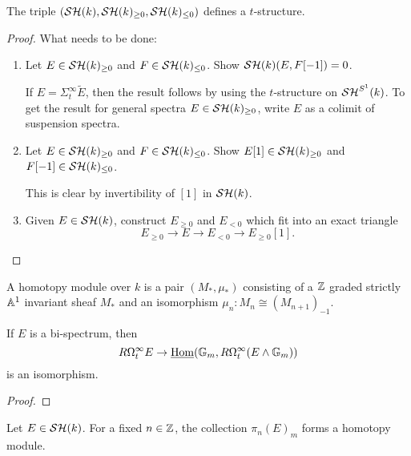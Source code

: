 \documentclass{amsart}%
\begin{document}
\begin{theorem}
  The triple $(\mathcal{SH}(k), \mathcal{SH}(k)_{\geq 0}, \mathcal{SH}(k)_{\leq 0})$ defines a
  $t$-structure.
\end{theorem}

\begin{proof}
What needs to be done: 
\begin{enumerate}
    \item Let $E \in \mathcal{SH}(k)_{\geq 0}$ and $F \in \mathcal{SH}(k)_{\leq
    0}$. Show $\mathcal{SH}(k)(E,F[-1])=0$. 

  If $E = \Sigma^{\infty}_t \tilde{E}$, then the result follows by
  using the $t$-structure on $\mathcal{SH}^{S^1}(k)$. To get the result for
  general spectra $E \in \mathcal{SH}(k)_{\geq 0}$, write $E$ as a colimit of 
  suspension spectra.

    \item Let $E \in \mathcal{SH}(k)_{\geq 0}$ and $F \in \mathcal{SH}(k)_{\leq 0}$.
  Show $E[1] \in \mathcal{SH}(k)_{\geq 0}$ and $F[-1] \in \mathcal{SH}(k)_{\leq 0}$.

  This is clear by invertibility of $[1]$ in $\mathcal{SH}(k)$.

    \item Given $E \in \mathcal{SH}(k)$, construct $E_{\geq 0}$ and $E_{<0}$
  which fit into an exact triangle
  \begin{equation*}
    E_{\geq 0} \to E \to E_{<0} \to E_{\geq 0}[1].
  \end{equation*}
\end{enumerate}
\end{proof}

\begin{definition}
  A homotopy module over $k$ is a pair $(M_*, \mu_*)$ consisting of a
  $\mathbb{Z}$ graded strictly $\mathbb{A}^1$ invariant sheaf $M_*$ and an
  isomorphism $\mu_n : M_n \cong (M_{n+1})_{-1}$. 
\end{definition}

\begin{lemma}
  If $E$ is a bi-spectrum, then 
  \begin{equation*}
    R\Omega^{\infty}_t E \to \underline{\operatorname{Hom}}(\mathbb{G}_m, R\Omega^{\infty}_t(E\wedge \mathbb{G}_m))
  \end{equation*}
  is an isomorphism.
\end{lemma}

\begin{proof}
  
\end{proof}

\begin{lemma}
  Let $E \in \mathcal{SH}(k)$. For a fixed $n\in\mathbb{Z}$, the collection
  $\pi_{n}(E)_{m}$ forms a homotopy module.
\end{lemma}
\end{document}
